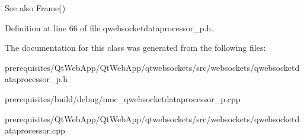 \begin{DoxySeeAlso}{See also}
Frame() 
\end{DoxySeeAlso}


Definition at line 66 of file qwebsocketdataprocessor\+\_\+p.\+h.



The documentation for this class was generated from the following files\+:\begin{DoxyCompactItemize}
\item 
prerequisites/\+Qt\+Web\+App/\+Qt\+Web\+App/qtwebsockets/src/websockets/qwebsocketdataprocessor\+\_\+p.\+h\item 
prerequisites/build/debug/moc\+\_\+qwebsocketdataprocessor\+\_\+p.\+cpp\item 
prerequisites/\+Qt\+Web\+App/\+Qt\+Web\+App/qtwebsockets/src/websockets/qwebsocketdataprocessor.\+cpp\end{DoxyCompactItemize}

